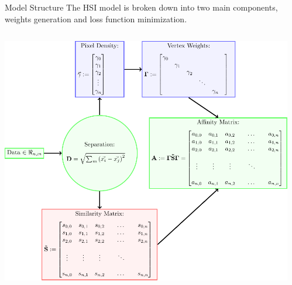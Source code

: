 \begin{frame}{Model Structure}
    The HSI model is broken down into two main components, \alert{weights generation} and {loss function minimization}. 

    \vfill
    
    \begin{columns}
        \begin{column}{.7\textwidth}
            \includegraphics[width=\textwidth]{../Images/model_pipeline_tikz/Phase1_tikz/tikz.pdf}    
        \end{column}
        \begin{column}{.3\textwidth}
\end{column}
\end{columns}
\end{frame}
